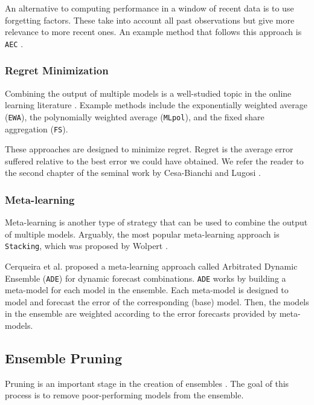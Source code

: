 \documentclass[smallcondensed]{svjour3}
\begin{document}
An alternative to computing performance in a window of recent data is to use forgetting factors. These take into account all past observations but give more relevance to more recent ones. An example method that follows this approach is \texttt{AEC} \cite{sanchez2008adaptive}.


\subsubsection{Regret Minimization}\label{sec:rw2.2}

Combining the output of multiple models is a well-studied topic in the online learning literature \cite{Cesa-Bianchi:2006:PLG:1137817}. Example methods include the exponentially weighted average (\texttt{EWA}), the polynomially weighted average (\texttt{MLpol}), and the fixed share aggregation (\texttt{FS}). 

These approaches are designed to minimize regret. Regret is the average error suffered relative to the best error we could have obtained. We refer the reader to the second chapter of the seminal work by Cesa-Bianchi and Lugosi \cite{Cesa-Bianchi:2006:PLG:1137817}.

\subsubsection{Meta-learning}\label{sec:rw2.3}

Meta-learning is another type of strategy that can be used to combine the output of multiple models.
Arguably, the most popular meta-learning approach is \texttt{Stacking}, which was proposed by Wolpert \cite{wolpert1992stacked}.

Cerqueira et al. \cite{cerqueira2019arbitrage} proposed a meta-learning approach called Arbitrated Dynamic Ensemble (\texttt{ADE}) for dynamic forecast combinations.
\texttt{ADE} works by building a meta-model for each model in the ensemble. Each meta-model is designed to model and forecast the error of the corresponding (base) model. Then, the models in the ensemble are weighted according to the error forecasts provided by meta-models. 

\subsection{Ensemble Pruning}\label{sec:pruning}

Pruning is an important stage in the creation of ensembles \cite{mendes2012ensemble}. The goal of this process is to remove poor-performing models from the ensemble.
\end{document}
